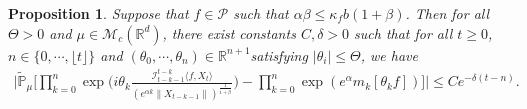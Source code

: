 \documentclass[12pt,a4paper]{amsart}
\theoremstyle{plain}
\newtheorem{prop}[thm]{Proposition}
\theoremstyle{definition}
\numberwithin{equation}{section}
\begin{document}
\begin{prop}\label{corollary31}
    Suppose that $f\in \mathcal{P}$ such that $\alpha\beta\leq\kappa_fb(1+\beta)$. 
    Then for all $\Theta >0$ and $\mu\in \mathcal M_c(\mathbb R^d)$, there exist constants $C,\delta>0$ such that for all $t\geq 0$, $n \in \{0, \cdots, \lfloor t \rfloor\}$ and $(\theta_0, \cdots, \theta_n)\in \mathbb R^{n+1}$satisfying $|\theta_i|\leq \Theta$, we have
\begin{equation}\begin{split}
\label{32corollary}
    \Big|\mathbb{\tilde{P}}_{\mu}\Big[\prod_{k=0}^n\exp\Big(i\theta_k \frac {\mathcal I_{t-k-1}^{t-k}\langle f ,X_t\rangle}{(e^{\alpha k}\|X_{t-k-1}\|)^\frac{1}{1+\beta}}\Big)-\prod_{k=0}^n\exp(e^{\alpha}m_k[\theta_k f])\Big]\Big|\leq C e^{-\delta(t-n)}.
\end{split}\end{equation}
\end{prop}
\end{document}

